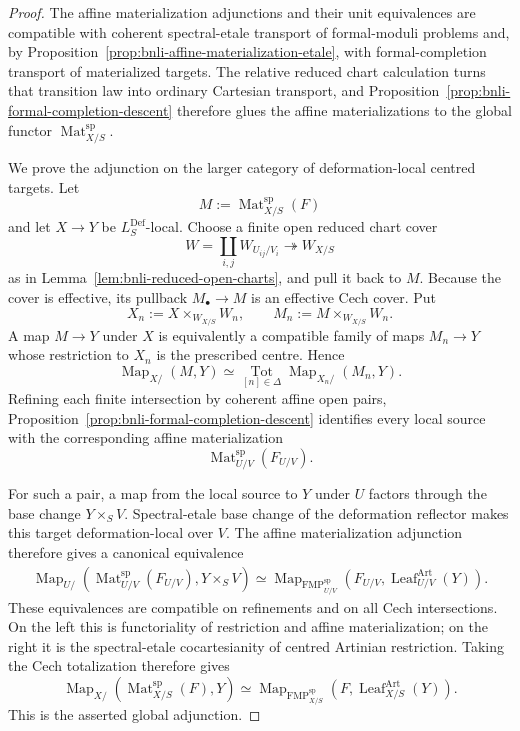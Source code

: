 \begin{proof}
The affine materialization adjunctions and their unit equivalences are
compatible with coherent spectral-etale transport of formal-moduli problems
and, by Proposition~\ref{prop:bnli-affine-materialization-etale}, with
formal-completion transport of materialized targets.  The relative reduced
chart calculation turns that transition law into ordinary Cartesian transport,
and Proposition~\ref{prop:bnli-formal-completion-descent} therefore glues the
affine materializations to the global functor
$\operatorname{Mat}^{\mathrm{sp}}_{X/S}$.

We prove the adjunction on the larger category of deformation-local centred
targets.  Let
\[
    M:=\operatorname{Mat}^{\mathrm{sp}}_{X/S}(F)
\]
and let $X\to Y$ be $L_S^{\mathrm{Def}}$-local.  Choose a finite open reduced
chart cover
\[
    W=\coprod_{i,j}W_{U_{ij}/V_i}\twoheadrightarrow W_{X/S}
\]
as in Lemma~\ref{lem:bnli-reduced-open-charts}, and pull it back to $M$.
Because the cover is effective, its pullback $M_\bullet\to M$ is an
effective Cech cover.  Put
\[
    X_n:=X\times_{W_{X/S}}W_n,
    \qquad
    M_n:=M\times_{W_{X/S}}W_n.
\]
A map $M\to Y$ under $X$ is equivalently a compatible family of maps
$M_n\to Y$ whose restriction to $X_n$ is the prescribed centre.  Hence
\[
    \operatorname{Map}_{X/}(M,Y)
    \simeq
    \operatorname*{Tot}_{[n]\in\Delta}
    \operatorname{Map}_{X_n/}(M_n,Y).
\]
Refining each finite intersection by coherent affine open pairs,
Proposition~\ref{prop:bnli-formal-completion-descent} identifies every local
source with the corresponding affine materialization
\[
    \operatorname{Mat}^{\mathrm{sp}}_{U/V}(F_{U/V}).
\]

For such a pair, a map from the local source to $Y$ under $U$ factors through
the base change $Y\times_SV$.  Spectral-etale base change of the deformation
reflector makes this target deformation-local over $V$.  The affine
materialization adjunction therefore gives a canonical equivalence
\[
\begin{aligned}
    \operatorname{Map}_{U/}
    \left(
      \operatorname{Mat}^{\mathrm{sp}}_{U/V}(F_{U/V}),
      Y\times_SV
    \right)
    \simeq
    \operatorname{Map}_{\operatorname{FMP}^{\mathrm{sp}}_{U/V}}
    \left(
      F_{U/V},
      \operatorname{Leaf}^{\mathrm{Art}}_{U/V}(Y)
    \right).
\end{aligned}
\]
These equivalences are compatible on refinements and on all Cech
intersections.  On the left this is functoriality of restriction and affine
materialization; on the right it is the spectral-etale cocartesianity of
centred Artinian restriction.  Taking the Cech totalization therefore gives
\[
\boxed{
\operatorname{Map}_{X/}
\left(
  \operatorname{Mat}^{\mathrm{sp}}_{X/S}(F),Y
\right)
\simeq
\operatorname{Map}_{\operatorname{FMP}^{\mathrm{sp}}_{X/S}}
\left(
  F,\operatorname{Leaf}^{\mathrm{Art}}_{X/S}(Y)
\right).}
\]
This is the asserted global adjunction.


\end{proof}
